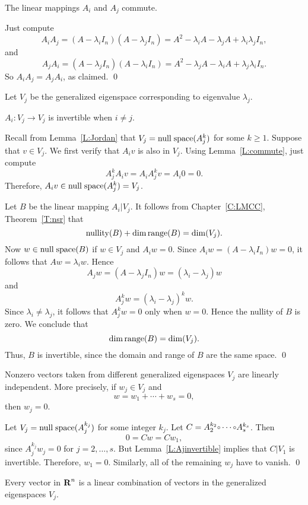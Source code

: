 \begin{lemma}  \label{L:commute}
The linear mappings $A_i$ and $A_j$ commute.
\end{lemma}

\proof Just compute
\[
A_iA_j = (A-\lambda_iI_n)(A-\lambda_jI_n)= A^2-\lambda_iA-\lambda_jA+
\lambda_i\lambda_jI_n,
\]
and
\[
A_jA_i = (A-\lambda_jI_n)(A-\lambda_iI_n)= A^2-\lambda_jA-\lambda_iA+
\lambda_j\lambda_iI_n.
\]
So $A_iA_j=A_jA_i$, as claimed.  \qed

Let $V_j$ be the generalized eigenspace corresponding to eigenvalue 
$\lambda_j$. 

\begin{lemma}  \label{L:Ajinvertible}
$A_i:V_j\to V_j$ is invertible when $i\neq j$.
\end{lemma}

\proof  Recall from Lemma~\ref{L:Jordan} that $V_j={\rm null\;space}(A_j^k)$ for some 
$k\ge 1$.  Suppose that $v\in V_j$.  We first verify that $A_iv$ is also in 
$V_j$.  Using Lemma~\ref{L:commute}, just compute 
\[
A_j^kA_iv = A_iA_j^kv = A_i0 = 0.
\]
Therefore, $A_iv\in{\rm null\;space}(A_j^k)=V_j$.
 
Let $B$ be the linear mapping $A_i|V_j$.  It follows from
Chapter~\ref{C:LMCC}, Theorem~\ref{T:nsr} that
\[
{\rm nullity}(B) +\dim{\rm range}(B) = \dim(V_j).
\]
Now $w\in{\rm null\;space}(B)$ if $w\in V_j$ and $A_iw=0$.  Since
$A_iw = (A-\lambda_iI_n)w = 0$, it follows that $Aw = \lambda_iw$.  Hence 
\[
A_jw = (A-\lambda_jI_n)w = (\lambda_i-\lambda_j)w
\]
and
\[
A_j^kw = (\lambda_i-\lambda_j)^kw.
\]
Since $\lambda_i\neq\lambda_j$, it follows that $A_j^kw=0$ only when $w=0$.
Hence the nullity of $B$ is zero.  We conclude that
\[
\dim{\rm range}(B) = \dim(V_j).
\]
Thus, $B$ is invertible, since the domain and range of $B$ are the same
space.  \qed

\begin{lemma}  \label{L:independentVj}
Nonzero vectors taken from different generalized eigenspaces $V_j$ are 
linearly independent.  More precisely, if $w_j\in V_j$ and 
\[
w = w_1 + \cdots + w_s = 0,
\]
then $w_j=0$.  
\end{lemma}

\proof Let $V_j={\rm null\;space}(A_j^{k_j})$ for some integer $k_j$.  Let
$C=A_2^{k_2}\compose\cdots\compose A_s^{k_s}$. Then 
\[
0 = Cw = Cw_1,
\]
since $A_j^{k_j}w_j=0$ for $j=2,\ldots,s$.   But Lemma~\ref{L:Ajinvertible} 
implies that $C|V_1$ is invertible.  Therefore, $w_1=0$.  Similarly, all of 
the remaining $w_j$ have to vanish.  \qed

\begin{lemma}  \label{L:spanVj}
Every vector in $\mbox{$\bf{R}$}^n$ is a linear combination of vectors in the generalized 
eigenspaces $V_j$.
\end{lemma}


